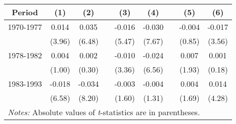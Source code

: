 \documentclass{article} %
\begin{document}
\begin{table}
{\begin{tabular}{c c c c c c c c c}
			Period    & (1)    & (2)    &&   (3)  &  (4)   &&  (5)   &  (6)     \\ \hline
			1970-1977 & 0.014  & 0.035  && -0.016 & -0.030 && -0.004 & -0.017   \\
			& (3.96) & (6.48) && (5.47) & (7.67) && (0.85) & (3.56)   \\
			1978-1982 & 0.004  & 0.002  && -0.010 & -0.024 && 0.007  & 0.001    \\
			& (1.00) & (0.30) && (3.36) & (6.56) && (1.93) & (0.18)   \\
			1983-1993 & -0.018 & -0.034 && -0.003 & -0.004 && 0.004  & 0.014    \\
			& (6.58) & (8.20) && (1.60) & (1.31) && (1.69) & (4.28)   \\
			\hline	
			\multicolumn{9}{l}{{\footnotesize \textit{Notes:} Absolute values of \textit{t}-statistics are in parentheses.}}	
		\end{tabular}
	}
\end{table}
\end{document}
